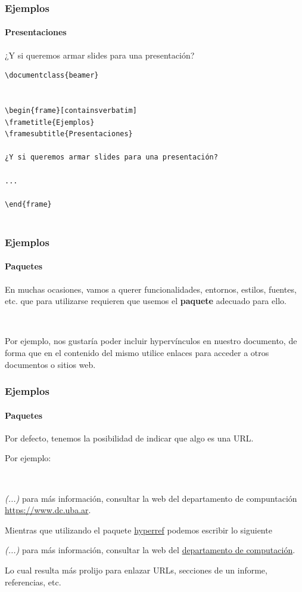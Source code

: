 \begin{frame}[containsverbatim]
\frametitle{Ejemplos}
\framesubtitle{Presentaciones}

¿Y si queremos armar slides para una presentación?

\begin{lstlisting}
\documentclass{beamer}


\begin{frame}[containsverbatim]
\frametitle{Ejemplos}
\framesubtitle{Presentaciones}

¿Y si queremos armar slides para una presentación?

...

\end{frame}


\end{lstlisting}

\end{frame}

\begin{frame}
\frametitle{Ejemplos}
\framesubtitle{Paquetes}

En muchas ocasiones, vamos a querer funcionalidades, entornos, estilos, fuentes, etc. que para utilizarse requieren que usemos el \textbf{paquete} adecuado para ello.

\

Por ejemplo, nos gustaría poder incluir hypervínculos en nuestro documento, de forma que en el contenido del mismo utilice enlaces para acceder a otros documentos o sitios web.
\end{frame}

\begin{frame}
\frametitle{Ejemplos}
\framesubtitle{Paquetes}

Por defecto, tenemos la posibilidad de indicar que algo es una URL. 

Por ejemplo:

\

\begin{center}
\textit{(...)} para más información, consultar la web del departamento de compuntación \url{https://www.dc.uba.ar}.
\end{center}

\pause

Mientras que utilizando el paquete \href{https://ctan.org/pkg/hyperref}{hyperref} podemos escribir lo siguiente


\begin{center}
\textit{(...)} para más información, consultar la web del \href{https://www.dc.uba.ar}{departamento de computación}.
\end{center}

Lo cual resulta más prolijo para enlazar URLs, secciones de un informe, referencias, etc.

\end{frame}

